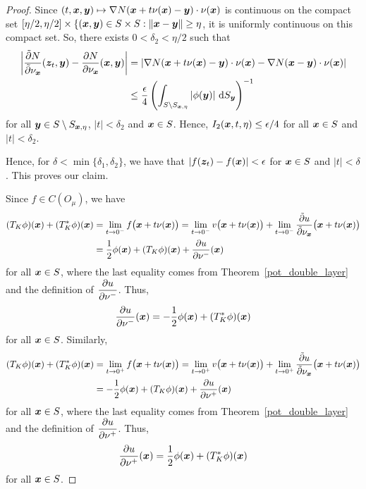 \begin{proof}
 Since $\displaystyle (t,{\bm{x}},{\bm{y}}) \mapsto
\nabla N({\bm{x}} + t \nu({\bm{x}}) - {\bm{y}}) \cdot \nu({\bm{x}})$
is continuous on the compact set
$[\eta/2,\eta/2] \times \{({\bm{x}},{\bm{y}}) \in S \times S :
\|{\bm{x}} - {\bm{y}}\| \geq \eta$,
it is uniformly continuous on this compact set.  So, there exists
$0 < \delta_2 < \eta/2$ such that
\begin{align*}
\left| \frac{\tilde{\partial}{N}}{\tilde{\partial}{\nu_{{\bm{x}}}}}({\bm{z}}_t,{\bm{y}}) -
\frac{\partial{N}}{\partial \nu_{{\bm{x}}}}({\bm{x}},{\bm{y}})\right|
&= \left| \nabla N({\bm{x}} + t \nu({\bm{x}}) - {\bm{y}})
\cdot \nu({\bm{x}}) -
\nabla N({\bm{x}} - {\bm{y}}) \cdot \nu({\bm{x}}) \right| \\
&\leq \frac{\epsilon}{4} \left(
\int_{S\setminus S_{{\bm{x}},\eta}}\left|\phi({\bm{y}})\right|
\,\mathrm{d}{S}_{{\bm{y}}} \right)^{-1}
\end{align*}
for all $\displaystyle {\bm{y}} \in S \setminus S_{{\bm{x}},\eta}$,
$|t| < \delta_2$ and ${\bm{x}} \in S$.
Hence,
$\displaystyle I_2({\bm{x}},t,\eta) \leq \epsilon/4$ for all ${\bm{x}} \in S$
and $|t| < \delta_2$.

 Hence, for $\delta < \min\{\delta_1,\delta_2\}$, we have
that 
$\displaystyle \left| f({\bm{z}}_t) - f({\bm{x}}) \right|< \epsilon$ for
${\bm{x}} \in S$ and $|t|< \delta$.  This proves our claim.

 Since $f \in C(O_\mu)$, we have
\begin{align*}
(T_K \phi)({\bm{x}}) + (T^\ast_K \phi)({\bm{x}}) &=
\lim_{t\rightarrow 0^-} f\big({\bm{x}}+t\nu({\bm{x}})\big)
= \lim_{t\rightarrow 0^-} v\big({\bm{x}}+t\nu({\bm{x}})\big)
+ \lim_{t\rightarrow 0^-}
\frac{\tilde{\partial}{u}}{\tilde{\partial}{\nu_{{\bm{x}}}}}\big({\bm{x}}+t\nu({\bm{x}})\big) \\
&= \frac{1}{2} \phi({\bm{x}}) + (T_K \phi)({\bm{x}}) + 
\frac{\partial{u}}{\partial \nu^-}({\bm{x}})
\end{align*}
for all ${\bm{x}} \in S$, where the last equality comes from
Theorem~\ref{pot_double_layer} and the definition of
$\displaystyle \frac{\partial{u}}{\partial \nu^-}$.  Thus,
\[
\frac{\partial{u}}{\partial \nu^-}({\bm{x}}) =
-\frac{1}{2} \phi({\bm{x}}) + (T^\ast_K \phi)({\bm{x}})
\]
for all ${\bm{x}} \in S$.  Similarly,
\begin{align*}
(T_K \phi)({\bm{x}}) + (T^\ast_K \phi)({\bm{x}}) &=
\lim_{t\rightarrow 0^+} f\big({\bm{x}}+t\nu({\bm{x}})\big)
= \lim_{t\rightarrow 0^+} v\big({\bm{x}}+t\nu({\bm{x}})\big)
+ \lim_{t\rightarrow 0^+}
\frac{\tilde{\partial}{u}}{\tilde{\partial}{\nu_{{\bm{x}}}}}\big({\bm{x}}+t\nu({\bm{x}})\big) \\
&= -\frac{1}{2} \phi({\bm{x}}) + (T_K \phi)({\bm{x}}) + 
\frac{\partial{u}}{\partial \nu^+}({\bm{x}})
\end{align*}
for all ${\bm{x}} \in S$, where the last equality comes from
Theorem~\ref{pot_double_layer} and the definition of
$\displaystyle \frac{\partial{u}}{\partial \nu^+}$.  Thus,
\[
\frac{\partial{u}}{\partial \nu^+}({\bm{x}}) =
\frac{1}{2} \phi({\bm{x}}) + (T^\ast_K \phi)({\bm{x}})
\]
for all ${\bm{x}} \in S$.


\end{proof}
